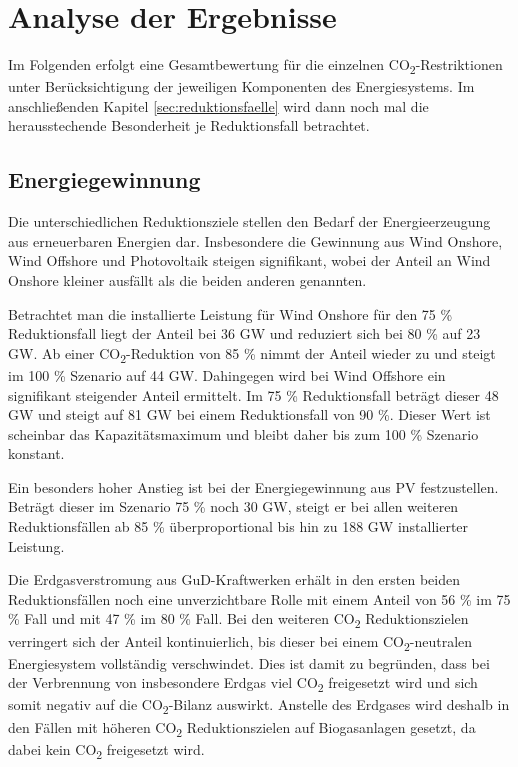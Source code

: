 \section{Analyse der Ergebnisse}
\label{sec:gesamtanalyse}

Im Folgenden erfolgt eine Gesamtbewertung für die einzelnen CO\textsubscript{2}-Restriktionen unter Berücksichtigung der jeweiligen Komponenten des Energiesystems. Im anschließenden Kapitel \ref{sec:reduktionsfaelle} wird dann noch mal die herausstechende Besonderheit je Reduktionsfall betrachtet. 

\subsection{Energiegewinnung}
Die unterschiedlichen Reduktionsziele stellen den Bedarf der Energieerzeugung aus erneuerbaren Energien dar. Insbesondere die Gewinnung aus Wind Onshore, Wind Offshore und Photovoltaik steigen signifikant, wobei der Anteil an Wind Onshore kleiner ausfällt als die beiden anderen genannten. 

Betrachtet man die installierte Leistung für Wind Onshore für den 75 \% Reduktionsfall liegt der Anteil bei 36 GW und reduziert sich bei 80 \% auf 23 GW. Ab einer CO\textsubscript{2}-Reduktion von 85 \% nimmt der Anteil wieder zu und steigt im 100 \% Szenario auf 44 GW. 
Dahingegen wird bei Wind Offshore ein signifikant steigender Anteil ermittelt. Im 75 \% Reduktionsfall beträgt dieser 48 GW und steigt auf 81 GW bei einem Reduktionsfall von 90 \%. Dieser Wert ist scheinbar das Kapazitätsmaximum und bleibt daher bis zum 100 \% Szenario konstant.

Ein besonders hoher Anstieg ist bei der Energiegewinnung aus PV festzustellen. Beträgt dieser im Szenario 75 \% noch 30 GW, steigt er bei allen weiteren Reduktionsfällen ab 85 \% überproportional bis hin zu 188 GW installierter Leistung.


Die Erdgasverstromung aus GuD-Kraftwerken erhält in den ersten beiden Reduktionsfällen noch eine unverzichtbare Rolle mit einem Anteil von 56 \% im 75 \% Fall und mit 47 \% im 80 \% Fall. Bei den weiteren CO\textsubscript{2} Reduktionszielen verringert sich der Anteil kontinuierlich, bis dieser bei einem CO\textsubscript{2}-neutralen Energiesystem vollständig verschwindet. Dies ist damit zu begründen, dass bei der Verbrennung von insbesondere Erdgas viel CO\textsubscript{2} freigesetzt wird und sich somit negativ auf die CO\textsubscript{2}-Bilanz auswirkt. Anstelle des Erdgases wird deshalb in den Fällen mit höheren CO\textsubscript{2} Reduktionszielen auf Biogasanlagen gesetzt, da dabei kein CO\textsubscript{2} freigesetzt wird. 


